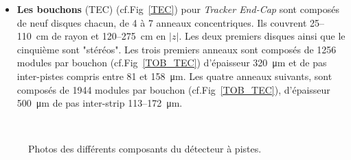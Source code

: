 \begin{itemize}[label=$\bullet$]
\item \textbf{Les bouchons }(TEC) (cf.Fig~\ref{TEC}) pour \textit{Tracker End-Cap} sont composés de neuf disques chacun, de \num{4} à \num{7} anneaux concentriques. Ils couvrent \num{25}--\SI{110}{\centi\meter} de rayon et \num{120}--\SI{275}{\centi\meter} en $|z|$. Les deux premiers disques ainsi que le cinquième sont "stéréos". Les trois premiers anneaux sont composés de \num{1256} modules par bouchon (cf.Fig~\ref{TOB_TEC}) d'épaisseur \SI{320}{\micro\meter} et de pas inter-pistes compris entre \num{81} et \SI{158}{\micro\meter}. Les quatre anneaux suivants, sont composés de \num{1944} modules par bouchon (cf.Fig~\ref{TOB_TEC}), d'épaisseur \SI{500}{\micro\meter} de pas inter-strip \num{113}--\SI{172}{\micro\meter}.
\end{itemize}

	\begin{figure}[ht!]
	\centering
	\\
	\caption{Photos des différents composants du détecteur à pistes.}
\end{figure}

